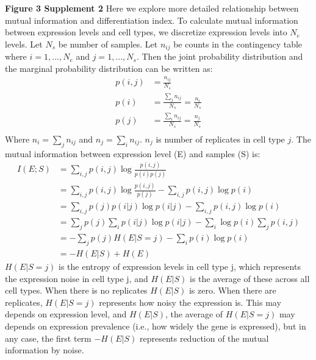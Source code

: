 
\textbf{Figure 3 Supplement 2}
\label{subsec:MI-and-DI}
Here we explore more detailed relationship between mutual information and differentiation index. To calculate mutual information between expression levels and cell types, we discretize expression levels into $N_{e}$ levels. Let $N_{s}$ be number of samples. Let $n_{ij}$ be counts in the contingency table where $i=1,...,N_{e}$ and $j=1,...,N_{s}$. Then the joint probability distribution and the marginal probability distribution can be written as:
\begin{align}
p(i,j) &= \frac{n_{ij}}{N_{s}} \\
p(i) &= \frac{\sum_{j}{n_{ij}}}{N_{s}} = \frac{n_i}{N_s} \\
p(j) &= \frac{\sum_{i}{n_{ij}}}{N_{s}} = \frac{n_j}{N_s}\\
\end{align}
Where $n_i = \sum_{j}{n_{ij}}$ and $n_j=\sum_{i}n_{ij}$. $n_j$ is number of replicates in cell type $j$. The mutual information between expression level (E) and samples (S) is:
\begin{align}
I(E;S) &= \sum_{i,j}{p(i,j)\log\frac{p(i,j)}{p(i)p(j)}} \\
       &= \sum_{i,j}{p(i,j)\log\frac{p(i,j)}{p(j)}}-\sum_{i,j}p(i,j)\log{p(i)}  \\
       &= \sum_{i,j}p(j)p(i|j)\log{p(i|j)}-\sum_{i,j}p(i,j)\log{p(i)}  \\
       &= \sum_{j}p(j)\sum_{i}p(i|j)\log{p(i|j)}-\sum_{i}\log{p(i)}\sum_{j}p(i,j)  \\
       &= -\sum_{j}p(j)H(E|S=j)-\sum_{i}p(i)\log{p(i)}  \\
       &= -H(E|S)+H(E)
\end{align}
$H(E|S=j)$ is the entropy of expression levels in cell type j, which represents the expression noise in cell type j, and $H(E|S)$ is the average of these across all cell types. When there is no replicates $H(E|S)$ is zero. When there are replicates, $H(E|S=j)$ represents how noisy the expression is. This may depends on expression level, and $H(E|S)$, the average of $H(E|S=j)$ may depends on expression prevalence (i.e., how widely the gene is expressed), but in any case, the first term $-H(E|S)$ represents reduction of the mutual information by noise. 

